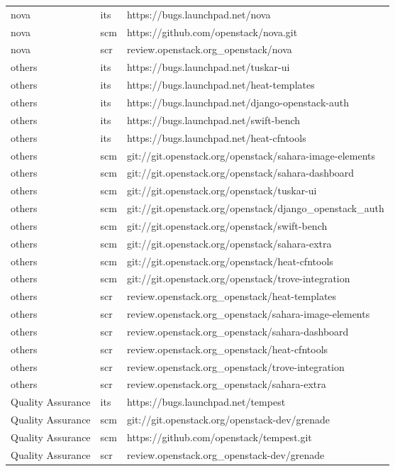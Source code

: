 \begin{center}
\begin{longtable}{|p{4cm}|p{1cm}|p{10cm}|}
nova&its&https://bugs.launchpad.net/nova\\ 
nova&scm&https://github.com/openstack/nova.git\\ 
nova&scr&review.openstack.org\_openstack/nova\\ 
others&its&https://bugs.launchpad.net/tuskar-ui\\ 
others&its&https://bugs.launchpad.net/heat-templates\\ 
others&its&https://bugs.launchpad.net/django-openstack-auth\\ 
others&its&https://bugs.launchpad.net/swift-bench\\ 
others&its&https://bugs.launchpad.net/heat-cfntools\\ 
others&scm&git://git.openstack.org/openstack/sahara-image-elements\\ 
others&scm&git://git.openstack.org/openstack/sahara-dashboard\\ 
others&scm&git://git.openstack.org/openstack/tuskar-ui\\ 
others&scm&git://git.openstack.org/openstack/django\_openstack\_auth\\ 
others&scm&git://git.openstack.org/openstack/swift-bench\\ 
others&scm&git://git.openstack.org/openstack/sahara-extra\\ 
others&scm&git://git.openstack.org/openstack/heat-cfntools\\ 
others&scm&git://git.openstack.org/openstack/trove-integration\\ 
others&scr&review.openstack.org\_openstack/heat-templates\\ 
others&scr&review.openstack.org\_openstack/sahara-image-elements\\ 
others&scr&review.openstack.org\_openstack/sahara-dashboard\\ 
others&scr&review.openstack.org\_openstack/heat-cfntools\\ 
others&scr&review.openstack.org\_openstack/trove-integration\\ 
others&scr&review.openstack.org\_openstack/sahara-extra\\ 
Quality Assurance&its&https://bugs.launchpad.net/tempest\\ 
Quality Assurance&scm&git://git.openstack.org/openstack-dev/grenade\\ 
Quality Assurance&scm&https://github.com/openstack/tempest.git\\ 
Quality Assurance&scr&review.openstack.org\_openstack-dev/grenade\\ 

\end{longtable}
\end{center}
